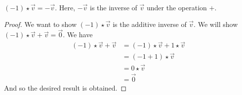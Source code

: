 \documentclass[main.tex]{subfiles}
\begin{document}
    \begin{prop}{}{}
        $(-1) \star \Vec{v} = -\Vec{v}$. Here, $-\Vec{v}$ is the inverse of $\Vec{v}$ under the operation $+$.
    \end{prop}
    \begin{proof}
        We want to show $(-1)\star \Vec{v}$ is the additive inverse of $\Vec{v}$. We will show $(-1)\star \Vec{v} + \Vec{v} = \Vec{0}$. We have 
        \begin{align*}
            (-1) \star \Vec{v} + \Vec{v} &= (-1) \star \Vec{v} + 1\star \Vec{v} \\
            &= (-1 + 1) \star \Vec{v} \\
            &= 0 \star \Vec{v} \\
            &= \Vec{0}
        \end{align*}
        And so the desired result is obtained.
    \end{proof}
\end{document}
